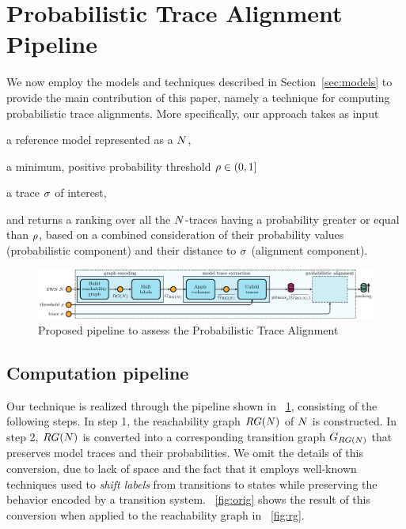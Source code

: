 

\section{Probabilistic Trace Alignment Pipeline}
We now employ the models and techniques described in Section~\ref{sec:models} to provide the main contribution of this paper, namely a technique for computing probabilistic trace alignments. More specifically, our approach takes as input
\begin{inparaenum}[\it (i)]
\item a reference model represented as a \uswn $N$,
\item a minimum, positive probability threshold $\rho \in (0,1]$
\item a trace $\sigma$ of interest,
\end{inparaenum}
and returns a ranking over all the $N$-traces having a probability greater or equal than $\rho$, based on a combined consideration of their probability values (probabilistic component) and their distance to $\sigma$ (alignment component).

\begin{figure}[!t]
	\hspace*{-1cm}\includegraphics[width=1.2\textwidth]{images/pipeline}
	\caption{Proposed pipeline to assess the Probabilistic Trace Alignment}\label{fig:pipe}
\end{figure}


\subsection{Computation pipeline}
Our technique is realized through the pipeline shown in \figurename~\ref{fig:pipe}, consisting of the following steps.
%
In step 1, the reachability graph $RG(N)$ of $N$ is constructed.
%
In step 2,  $RG(N)$ is converted into a corresponding transition graph $G_{RG(N)}$ that preserves model traces and their probabilities. We omit the details of this conversion, due to lack of space and the fact that it employs well-known techniques used to \emph{shift labels} from transitions to states while preserving the behavior encoded by a transition system. \figurename~\ref{fig:orig} shows the result of this conversion when applied to the reachability graph in \figurename~\ref{fig:rg}.


